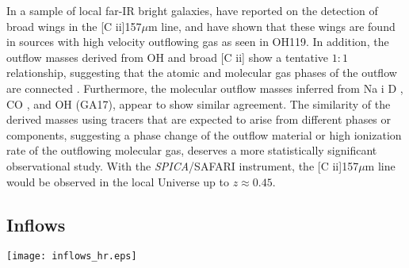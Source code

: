 \documentclass{pasa}%
\newcommand{\kms}{{\hbox {km\thinspace s$^{-1}$}}}
\begin{document}


In a sample of local far-IR bright galaxies, \cite{jan16} have reported on the
detection of broad wings in the [C {\sc ii}]157$\mu$m line, and have shown
that these wings are found in sources with high velocity outflowing gas as
seen in OH119. In addition, the outflow masses derived from OH and broad 
[C {\sc ii}] show a tentative $1:1$ relationship, suggesting that the
atomic and molecular gas phases of the outflow are connected
\citep{jan16}. Furthermore, the molecular outflow masses inferred from 
Na {\sc i} D \citep{rup13b}, CO \citep{cic14}, and OH (GA17), appear to show
similar agreement. The similarity of the derived masses using tracers that are
expected to arise from different phases or components, suggesting a phase
  change of the outflow material or high ionization rate of the
    outflowing molecular gas,
deserves a more statistically significant observational study. With  
the {\it SPICA}/SAFARI instrument, the [C {\sc ii}]157$\mu$m line would be
observed in the local Universe up to $z\approx0.45$.




\subsection{Inflows}
\label{sec:inflow}

\begin{figure*}
\begin{center}
\texttt{[image: inflows\_hr.eps]}
\caption{{\it Left}: The [O {\sc i}]63 $\mu$m line at 63 $\mu$m in the LIRG
  NGC~4418 observed with {\it Herschel}/PACS, showing an inverse P-Cygni
  profile characteristic of galaxy-scale inflowing gas (GA12). The spectrum is
  smoothed to a resolution of $R=1000$, and errorbars indicate the expected
  $\pm\sigma$ uncertainties at $z=0.2$ for {\it SPICA}/SAFARI in HR mode with
  5 hours of observing time. The spectral feature at $\sim700$ \kms\ is a very
  excited H$_2$O line formed in the inner galaxy core. The insert shows the
  unsmoothed spectrum. {\it Right}: the OH119
  spectrum in IRAS~15250+3609, showing redshifted absorption. The strong
  feature at $1600-2200$ \kms\ is due to redshifted CH$^+$, because the red
  component of the $^{18}$OH doublet is not detected. Errorbars indicate the 
  expected $\pm\sigma$ uncertainties at $z=0.5$ for {\it SPICA}/SAFARI in HR
  mode with 5 hours of observing time. 
} 
\label{inflows}
\end{center}
\end{figure*}
\end{document}

